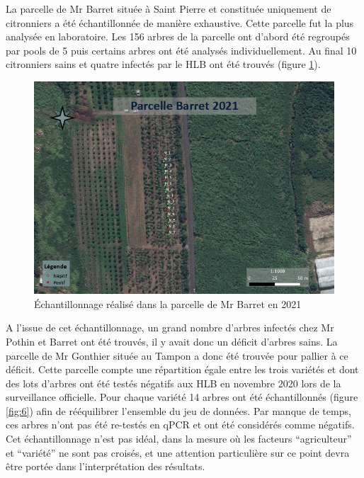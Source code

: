\documentclass[
  11pt,
  french,
  a4paper,
  extrafontsizes,onecolumn,openright
  ]{memoir}
\begin{document}
\normalsize

La parcelle de Mr Barret située à Saint Pierre et constituée uniquement de citronniers a été échantillonnée de manière exhaustive. Cette parcelle fut la plus analysée en laboratoire. Les 156 arbres de la parcelle ont d'abord été regroupés par pools de 5 puis certains arbres ont été analysés individuellement. Au final 10 citronniers sains et quatre infectés par le HLB ont été trouvés (figure \ref{fig:5}).

\scriptsize

\begin{figure}

{\centering \includegraphics[width=0.8\linewidth]{Images/Figure5} 

}

\caption{Échantillonnage réalisé dans la parcelle de Mr Barret en 2021}\label{fig:5}
\end{figure}

\normalsize
\vfill
\newpage
A l'issue de cet échantillonnage, un grand nombre d'arbres infectés chez Mr Pothin et Barret ont été trouvés, il y avait donc un déficit d'arbres sains. La parcelle de Mr Gonthier située au Tampon a donc été trouvée pour pallier à ce déficit. Cette parcelle compte une répartition égale entre les trois variétés et dont des lots d'arbres ont été testés négatifs aux HLB en novembre 2020 lors de la surveillance officielle. Pour chaque variété 14 arbres ont été échantillonnés (figure \ref{fig:6}) afin de rééquilibrer l'ensemble du jeu de données. Par manque de temps, ces arbres n'ont pas été re-testés en qPCR et ont été considérés comme négatifs. Cet échantillonnage n'est pas idéal, dans la mesure où les facteurs ``agriculteur'' et ``variété'' ne sont pas croisés, et une attention particulière sur ce point devra être portée dans l'interprétation des résultats.
\end{document}

